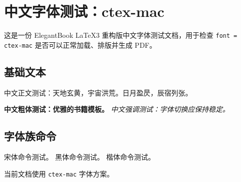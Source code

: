 \documentclass[lang = cn, font = ctex-mac, mode = simple]{elegantbook-l3}
\begin{document}
\frontmatter
\tableofcontents

\mainmatter
\chapter{中文字体测试：ctex-mac}

这是一份 ElegantBook LaTeX3 重构版中文字体测试文档，用于检查
\texttt{font = ctex-mac} 是否可以正常加载、排版并生成 PDF。

\section{基础文本}

中文正文测试：天地玄黄，宇宙洪荒。日月盈昃，辰宿列张。

\textbf{中文粗体测试：优雅的书籍模板。}
\emph{中文强调测试：字体切换应保持稳定。}

\section{字体族命令}

{\songti 宋体命令测试。}
{\heiti 黑体命令测试。}
{\kaishu 楷体命令测试。}

\begin{theorem}[字体方案]
  当前文档使用 \texttt{ctex-mac} 字体方案。
\end{theorem}
\end{document}
